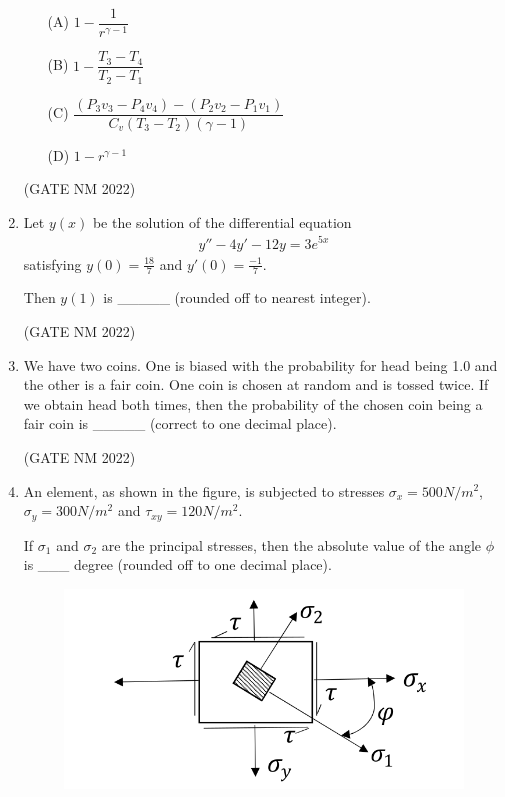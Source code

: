\documentclass[journal,12pt,onecolumn]{IEEEtran}
\theoremstyle{remark}
\begin{document}
\begin{enumerate}
\begin{multicols}{2}

\begin{enumerate}
    \item[(A)] $1 - \dfrac{1}{r^{\gamma - 1}}$
    \item[(B)] $1 - \dfrac{T_3 - T_4}{T_2 - T_1}$
    \item[(C)] $\dfrac{(P_3 v_3 - P_4 v_4) - (P_2 v_2 - P_1 v_1)}{C_v(T_3 - T_2)(\gamma - 1)}$
    \item[(D)] $1 - r^{\gamma - 1}$
\end{enumerate}

\end{multicols}

\hfill(GATE NM 2022)





\item  Let $y(x)$ be the solution of the differential equation  
\begin{align*}
y'' - 4y' - 12y = 3e^{5x}
\end{align*}
satisfying $y(0) = {\frac{18}{7}}$ and $y'(0) = {\frac{-1}{7}}$.  

Then $y(1)$ is \_\_\_\_\_ (rounded off to nearest integer).

\hfill(GATE NM 2022)




\item
We have two coins. One is biased with the probability for head being 1.0 and the other is a fair coin. One coin is chosen at random and is tossed twice. If we obtain head both times, then the probability of the chosen coin being a fair coin is \_\_\_\_\_  (correct to one decimal place).

\hfill(GATE NM 2022)








\item
An element, as shown in the figure, is subjected to stresses $\sigma_x = 500  N/m^2 $, $\sigma_y = 300  N/m^2 $ and $\tau_{xy} = 120  N/m^2 $.  

If $\sigma_1$ and $\sigma_2$ are the principal stresses, then the absolute value of the angle $\phi$ is \_\_\_ degree (rounded off to one decimal place).

\begin{figure}[h]
	\centering
	\includegraphics[width=0.5\columnwidth]{fig12}
	\caption{}
	\label{fig:placeholder}
\end{figure}


\end{enumerate}
\end{document}
